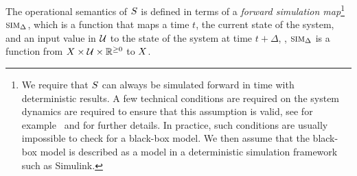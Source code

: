 The operational semantics of $S$ is defined in terms of a {\em
forward simulation map}\footnote{We require that $S$ can always
be simulated forward in time with deterministic results. A few
technical conditions are required on the system dynamics are required
to ensure that this assumption is valid, see for
example~\cite{Meiss/2007/Differential} and \cite{goebel2012hybrid} for
further details. In practice, such conditions are usually impossible
to check for a black-box model. We then assume that the black-box
model is described as a model in a deterministic simulation framework
such as Simulink\textregistered.} $\mbox{\sc sim}_\Delta$, which is a
function that maps a time $t$, the current state of the system, and an
input value in $\mathcal{U}$ to the state of the system at time
$t+\Delta$, \ie, $\mbox{\sc sim}_\Delta$ is a function from $X
\times \mathcal{U} \times \mathbb{R}^{\ge 0}$ to $X$.

%

%



